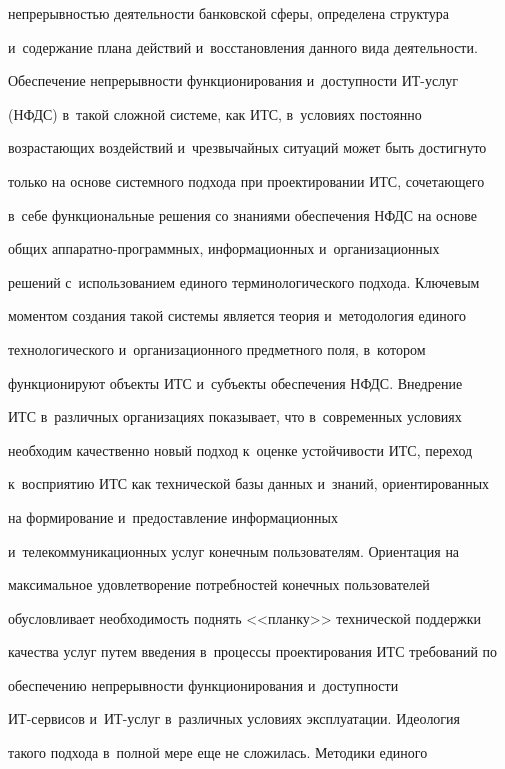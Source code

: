 непрерывностью деятельности банковской сферы, определена структура


и~содержание плана действий и~восстановления данного вида деятельности.





  Обеспечение непрерывности функционирования и~доступности ИТ-услуг


(НФДС) в~такой сложной системе, как ИТС, в~условиях постоянно


возрастающих воздействий и~чрезвычайных ситуаций может быть достигнуто


только на основе системного подхода при проектировании ИТС, сочетающего


в~себе функциональные решения со знаниями обеспечения НФДС на основе


общих ап\-па\-рат\-но-про\-грам\-мных, информационных и~организационных


решений с~использованием единого терминологического подхода. Ключевым


моментом создания такой системы является тео\-рия и~методология единого


технологического и~организационного предметного поля, в~котором


функционируют объекты ИТС и~субъекты обеспечения НФДС. Внедрение


ИТС в~различных организациях показывает, что в~современных условиях


необходим качественно новый подход к~оценке устойчивости ИТС, переход


к~восприятию ИТС как технической базы данных и~знаний, ориентированных


на формирование и~предоставление информационных


и~телекоммуникационных услуг конечным пользователям. Ориентация на


максимальное удовлетворение потребностей конечных пользователей


обу\-слов\-ливает необходимость поднять <<планку>> технической поддержки


качества услуг путем введения в~процессы проектирования ИТС требований по


обеспечению непрерывности функционирования и~доступности


  ИТ-сер\-ви\-сов и~ИТ-услуг в~различных условиях эксплуатации. Идеология


такого подхода в~полной мере еще не сложилась. Методики единого


